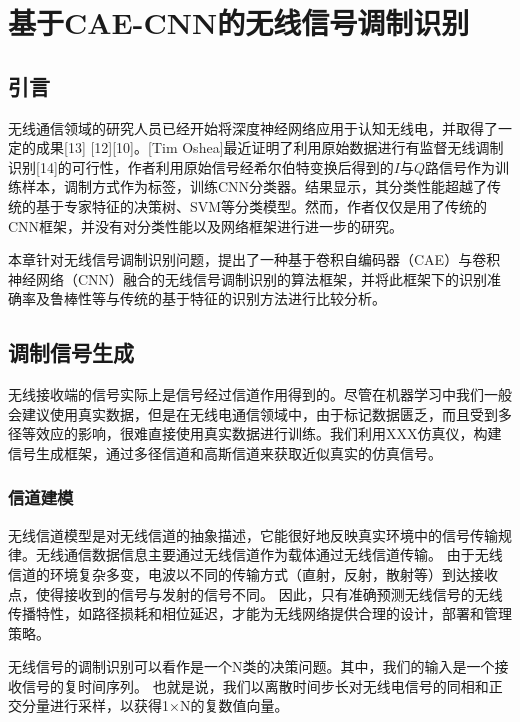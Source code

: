 \chapter{基于CAE-CNN的无线信号调制识别}

\section{引言}

无线通信领域的研究人员已经开始将深度神经网络应用于认知无线电，并取得了一定的成果[13] [12][10]。[Tim Oshea]最近证明了利用原始数据进行有监督无线调制识别[14]的可行性，作者利用原始信号经希尔伯特变换后得到的$I$与$Q$路信号作为训练样本，调制方式作为标签，训练CNN分类器。结果显示，其分类性能超越了传统的基于专家特征的决策树、SVM等分类模型。然而，作者仅仅是用了传统的CNN框架，并没有对分类性能以及网络框架进行进一步的研究。\par

本章针对无线信号调制识别问题，提出了一种基于卷积自编码器（CAE）与卷积神经网络（CNN）融合的无线信号调制识别的算法框架，并将此框架下的识别准确率及鲁棒性等与传统的基于特征的识别方法进行比较分析。\par


\section{调制信号生成}

无线接收端的信号实际上是信号经过信道作用得到的。尽管在机器学习中我们一般会建议使用真实数据，但是在无线电通信领域中，由于标记数据匮乏，而且受到多径等效应的影响，很难直接使用真实数据进行训练。我们利用XXX仿真仪，构建信号生成框架，通过多径信道和高斯信道来获取近似真实的仿真信号。\par


\subsection{信道建模}

无线信道模型是对无线信道的抽象描述，它能很好地反映真实环境中的信号传输规律。无线通信数据信息主要通过无线信道作为载体通过无线信道传输。 由于无线信道的环境复杂多变，电波以不同的传输方式（直射，反射，散射等）到达接收点，使得接收到的信号与发射的信号不同。 因此，只有准确预测无线信号的无线传播特性，如路径损耗和相位延迟，才能为无线网络提供合理的设计，部署和管理策略。\par

无线信号的调制识别可以看作是一个N类的决策问题。其中，我们的输入是一个接收信号的复时间序列。
也就是说，我们以离散时间步长对无线电信号的同相和正交分量进行采样，以获得1×N的复数值向量。

